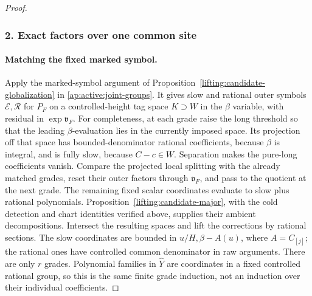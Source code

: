 \begin{proof}
\subsubsection*{2. Exact factors over one common site}

\paragraph{Matching the fixed marked symbol.}

Apply the marked-symbol argument of
Proposition~\ref{lifting:candidate-globalization} in
\eqref{ap:active:joint-groups}.  It gives slow and rational outer
symbols $\mathcal E,\mathcal R$ for $P_F$ on a controlled-height
tag space $K\supset W$ in the $\beta$ variable, with residual in
$\exp\mathfrak v_F$.  For completeness, at each grade raise the
long threshold so that the leading $\beta$-evaluation lies in the
currently imposed space.  Its projection off that space has
bounded-denominator rational coefficients, because $\beta$ is
integral, and is fully slow, because $C-c\in W$.  Separation makes
the pure-long coefficients vanish.  Compare the projected local
splitting with the already matched grades, reset their outer
factors through $\mathfrak v_F$, and pass to the quotient at the
next grade.  The remaining fixed scalar coordinates evaluate to
slow plus rational polynomials.  Proposition~\ref{lifting:candidate-major},
with the cold detection and chart identities verified above,
supplies their ambient decompositions.  Intersect the resulting
spaces and lift the corrections by rational sections.  The slow
coordinates are bounded in $u/H,\beta-A(u)$, where $A=C_{[j]}$;
the rational ones have controlled common denominator in raw
arguments.  There are only $r$ grades.  Polynomial families in
$\widehat Y$ are coordinates in a fixed controlled rational group,
so this is the same finite grade induction, not an induction over
their individual coefficients.


\end{proof}
